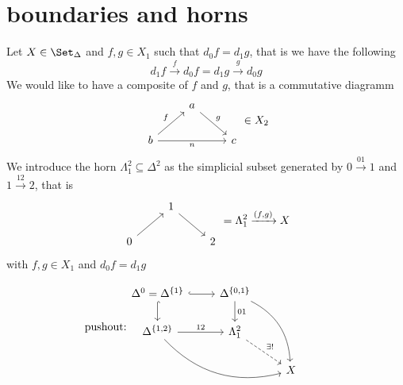 \section{boundaries and horns}

Let $X \in \Set_{\Delta}$ and $f,g \in X_1$ such that $d_0f=d_1g$, that is we have the following 
\[
d_1f\xrightarrow{f}d_0f=d_1g\xrightarrow{g}d_0g
\]
We would like to have a composite of $f$ and $g$, that is a commutative diagramm
\[
\begin{tikzcd}
    &
    a
    \arrow[rd, "g"]
    &
    \\
    b
    \arrow[ru, "f"]
    \arrow[rr, "n"']
    &
    &
    c
\end{tikzcd}
\in X_2
\]
We introduce the horn $\Lambda_1^2 \subseteq \Delta^2$ as the simplicial subset generated by $0 \xrightarrow{01}1$ and $1 \xrightarrow{12}2$, that is 
\[
\begin{tikzcd}
    &
    1
    \arrow[dr]
    &
    \\
    0
    \arrow[ur]
    &&
    2
\end{tikzcd}
=
\Lambda_1^2 
\xrightarrow{(f,g)}
X
\]
with $f,g \in X_1$ and $d_0f=d_1g$


\[
\text{pushout:}
\begin{tikzcd}
    \Delta^0=\Delta^{\{1\}}
    \arrow[r,hook]
    \arrow[d,hook]
    &
    \Delta^{\{0,1\}}
    \arrow[d,"01"]
    \arrow[rdd,bend left]
    &
    &
    \\
    \Delta^{\{1,2\}}
    \arrow[rrd, bend right]
    \arrow[r, "12"]
    &
    \Lambda^2_1
    \arrow[rd,dashed,"\exists!"]
    &
    &
    \\
    &
    &
    X
\end{tikzcd}
\]


